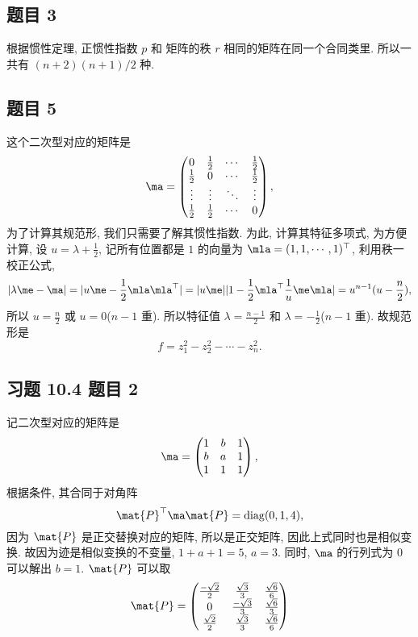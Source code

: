 \subsection*{ 题目 3 }
\begin{solution}
根据惯性定理, 正惯性指数 $p$ 和 矩阵的秩 $r$ 相同的矩阵在同一个合同类里. 所以一共有 $(n + 2)(n + 1) / 2$ 种.
\end{solution}

\subsection*{ 题目 5 }
\begin{solution}
这个二次型对应的矩阵是
\[
\ma = \begin{pmatrix}
    0 & \frac{1}{2} & \cdots & \frac{1}{2} \\
    \frac{1}{2} & 0 & \cdots & \frac{1}{2} \\
    \vdots & \vdots & \ddots & \vdots \\
    \frac{1}{2} & \frac{1}{2} & \cdots & 0
\end{pmatrix},
\]
为了计算其规范形, 我们只需要了解其惯性指数. 为此, 计算其特征多项式, 为方便计算, 设 $u = \lambda + \frac{1}{2}$, 记所有位置都是 $1$ 的向量为 $\mla = (1, 1, \cdots, 1)^{\top}$, 利用秩一校正公式,
\[
|\lambda \me - \ma| = |u \me - \frac{1}{2}\mla\mla^\top| = |u\me||1 - \frac{1}{2}\mla^\top \frac{1}{u}\me \mla| = u^{n - 1}(u - \frac{n}{2}),
\]
所以 $u = \frac{n}{2}$ 或 $u = 0$($n - 1$ 重). 所以特征值 $\lambda = \frac{n - 1}{2}$ 和 $\lambda = -\frac{1}{2}$($n - 1$ 重). 故规范形是
\[
f = z_1^2 - z_2^2 - \cdots - z_n^2.
\]
\end{solution}

\newcommand{\mpp}{\mat{P}}
\subsection*{ 习题 10.4 题目 2 }
\begin{solution}
记二次型对应的矩阵是
\[
\ma = \left(\begin{matrix}
    1 & b & 1 \\
    b & a & 1 \\
    1 & 1 & 1
    \end{matrix}\right),
\]
根据条件, 其合同于对角阵
\[
\mpp^\top \ma \mpp = \mathrm{diag}(0, 1, 4),
\]
因为 $\mpp$ 是正交替换对应的矩阵, 所以是正交矩阵, 因此上式同时也是相似变换. 故因为迹是相似变换的不变量, $1 + a + 1 = 5$, $a = 3$. 同时, $\ma$ 的行列式为 $0$ 可以解出 $b = 1$. $\mpp$ 可以取
\[
\mpp = \left(\begin{matrix}
    \frac{-\sqrt{2}}{2} & \frac{\sqrt{3}}{3} & \frac{\sqrt{6}}{6} \\
    0 & \frac{-\sqrt{3}}{3} & \frac{\sqrt{6}}{3} \\
    \frac{\sqrt{2}}{2} & \frac{\sqrt{3}}{3} & \frac{\sqrt{6}}{6}
    \end{matrix}\right)
\]
\end{solution}

